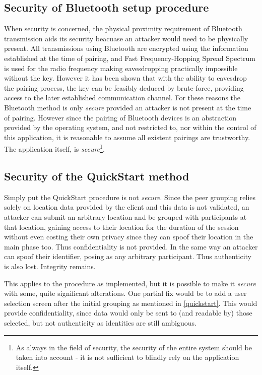 \subsection{Security of Bluetooth setup procedure}
When security is concerned, the physical proximity requirement of Bluetooth transmission aids its security beacuase an attacker would need to be physically present. All transmissions using Bluetooth are encrypted using the information established at the time of pairing, and Fast Frequency-Hopping Spread Spectrum is used for the radio frequency making eavesdropping practically impossible without the key.\cite{BTsec} However it has been shown that with the ability to eavesdrop the pairing process, the key can be feasibly deduced by brute-force, providing access to the later established communication channel.\cite{BTcrack}\cite{BTcracksource} For these reasons the Bluetooth method is only \emph{secure} provided an attacker is not present at the time of pairing. However since the pairing of Bluetooth devices is an abstraction provided by the operating system, and not restricted to, nor within the control of this application, it is reasonable to assume all existent pairings are trustworthy. The application itself, is \emph{secure}\footnote{As always in the field of security, the security of the entire system should be taken into account - it is not sufficient to blindly rely on the application itself.}.

\subsection{Security of the QuickStart method}
\label{secQuickstart}
Simply put the QuickStart procedure is not \emph{secure}. Since the peer grouping relies solely on location data provided by the client and this data is not validated, an attacker can submit an arbitrary location and be grouped with participants at that location, gaining access to their location for the duration of the session without even costing their own privacy since they can spoof their location in the main phase too. Thus confidentiality is not provided. In the same way an attacker can spoof their identifier, posing as any arbitrary participant. Thus authenticity is also lost. Integrity remains.

This applies to the procedure as implemented, but it is possible to make it \emph{secure} with some, quite significant alterations.
One partial fix would be to add a user selection screen after the initial grouping as mentioned in \ref{quickstart}. This would provide confidentiality, since data would only be sent to (and readable by) those selected, but not authenticity as identities are still ambiguous.

